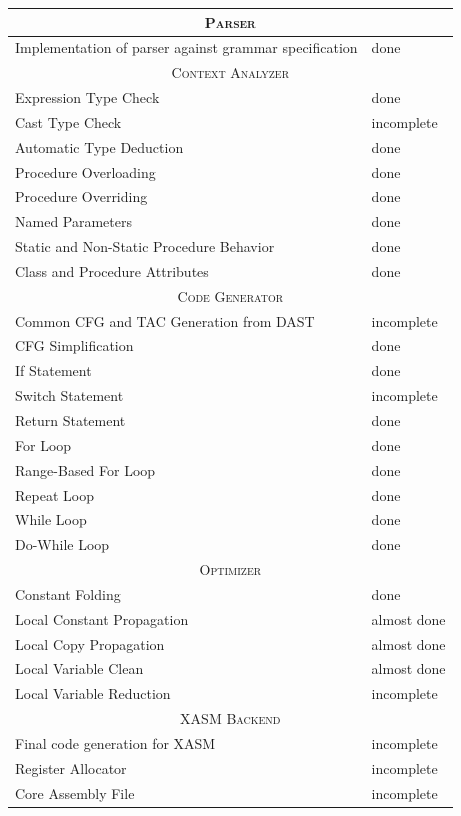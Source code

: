 \documentclass[a5paper]{report}
\def\done{\textcolor{weakGreen}{done}}
\def\almdone{\textcolor{weakYellow}{almost done}}
\def\incompl{\textcolor{weakOrange}{incomplete}}
\begin{document}
\begin{center}
\begin{tabular}[ht]{ | p{} | p{} | }
	\hline
	\multicolumn{2}{|c|}{\textsc{Parser}} \\
	\hline
	Implementation of parser against grammar specification & \done \\
	
	\hline \hline
	\multicolumn{2}{|c|}{\textsc{Context Analyzer}} \\
	\hline
	Expression Type Check & \done \\
	\hline
	Cast Type Check & \incompl \\
	\hline
	Automatic Type Deduction & \done \\
	\hline
	Procedure Overloading & \done \\
	\hline
	Procedure Overriding & \done \\
	\hline
	Named Parameters & \done \\
	\hline
	Static and Non-Static Procedure Behavior & \done \\
	\hline
	Class and Procedure Attributes & \done \\
	
	\hline \hline
	\multicolumn{2}{|c|}{\textsc{Code Generator}} \\
	\hline
	Common CFG and TAC Generation from DAST & \incompl \\
	\hline
	CFG Simplification & \done \\
	\hline
	If Statement & \done \\
	\hline
	Switch Statement & \incompl \\
	\hline
	Return Statement & \done \\
	\hline
	For Loop & \done \\
	\hline
	Range-Based For Loop & \done \\
	\hline
	Repeat Loop & \done \\
	\hline
	While Loop & \done \\
	\hline
	Do-While Loop & \done \\
	
	\hline \hline
	\multicolumn{2}{|c|}{\textsc{Optimizer}} \\
	\hline
	Constant Folding & \done \\
	\hline
	Local Constant Propagation & \almdone \\
	\hline
	Local Copy Propagation & \almdone \\
	\hline
	Local Variable Clean & \almdone \\
	\hline
	Local Variable Reduction & \incompl \\
	
	\hline \hline
	\multicolumn{2}{|c|}{\textsc{XASM Backend}} \\
	\hline
	Final code generation for XASM & \incompl \\
	\hline
	Register Allocator & \incompl \\
	\hline
	Core Assembly File & \incompl \\
	\hline
\end{tabular}
\end{center}
\end{document}
